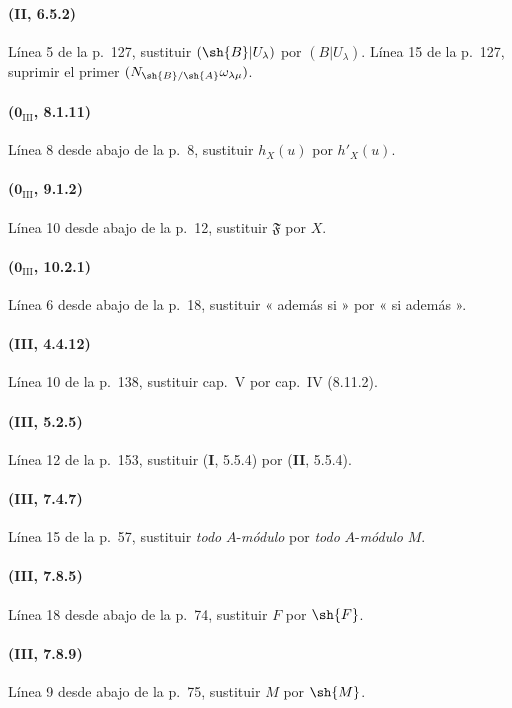 \paragraph{(II, 6.5.2)}
Línea 5 de la p.~127, sustituir $(\sh{B}|U_\lambda)$ por
$(B|U_\lambda)$. Línea 15 de la p.~127, suprimir el primer
$(N_{\sh{B}/\sh{A}}\omega_{\lambda\mu})$.

\paragraph{($\mathbf{0}_{\mathrm{III}}$, 8.1.11)}
Línea 8 desde abajo de la p.~8, sustituir $h_X(u)$ por $h'_X(u)$.

\paragraph{($\mathbf{0}_{\mathrm{III}}$, 9.1.2)}
Línea 10 desde abajo de la p.~12, sustituir $\mathfrak{F}$ por $X$.

\paragraph{($\mathbf{0}_{\mathrm{III}}$, 10.2.1)}
Línea 6 desde abajo de la p.~18, sustituir « además si » por « si
además ».

\paragraph{(III, 4.4.12)}
Línea 10 de la p.~138, sustituir cap.~V por cap.~IV (8.11.2).

\paragraph{(III, 5.2.5)}
Línea 12 de la p.~153, sustituir (\textbf I, 5.5.4) por (\textbf{II}, 5.5.4).

\paragraph{(III, 7.4.7)}
Línea 15 de la p.~57, sustituir \emph{todo} $A$-\emph{módulo} por \emph{todo}
$A$-\emph{módulo} $M$.

\paragraph{(III, 7.8.5)}
Línea 18 desde abajo de la p.~74, sustituir $F$ por $\sh{F}$.

\paragraph{(III, 7.8.9)}
Línea 9 desde abajo de la p.~75, sustituir $M$ por $\sh{M}$.

